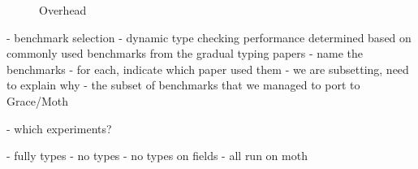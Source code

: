 \begin{figure}
	\TypingOverhead{}
	\caption{Overhead}
	\label{fig:typing-overhead}
\end{figure}

\begin{cnote}
- benchmark selection
 - dynamic type checking performance determined based on commonly used
   benchmarks from the gradual typing papers
   - name the benchmarks
   - for each, indicate which paper used them
   - we are subsetting, need to explain why
     - the subset of benchmarks that we managed to port to Grace/Moth


  - which experiments?
  
  - fully types
  - no types
  - no types on fields
  - all run on moth

\end{cnote}

